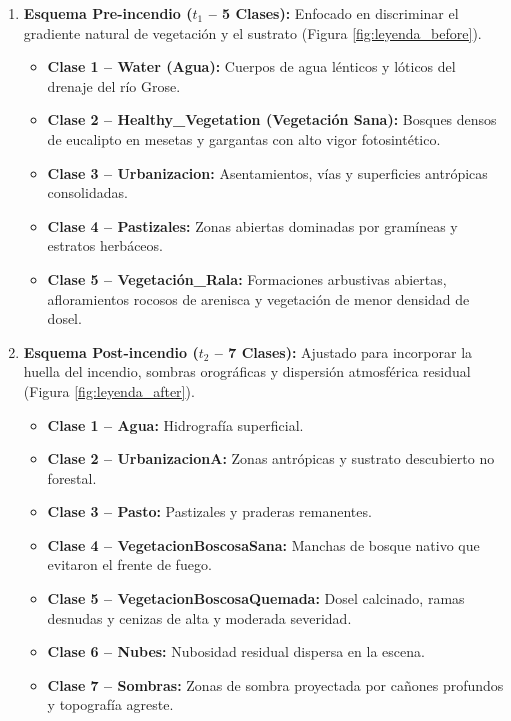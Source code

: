 \documentclass[12pt]{article}
\begin{document}
\begin{enumerate}
    \item \textbf{Esquema Pre-incendio ($t_1$ -- 5 Clases):} Enfocado en discriminar el gradiente natural de vegetación y el sustrato (Figura \ref{fig:leyenda_before}).
    \begin{itemize}
        \item \textbf{Clase 1 -- Water (Agua):} Cuerpos de agua lénticos y lóticos del drenaje del río Grose.
        \item \textbf{Clase 2 -- Healthy\_Vegetation (Vegetación Sana):} Bosques densos de eucalipto en mesetas y gargantas con alto vigor fotosintético.
        \item \textbf{Clase 3 -- Urbanizacion:} Asentamientos, vías y superficies antrópicas consolidadas.
        \item \textbf{Clase 4 -- Pastizales:} Zonas abiertas dominadas por gramíneas y estratos herbáceos.
        \item \textbf{Clase 5 -- Vegetación\_Rala:} Formaciones arbustivas abiertas, afloramientos rocosos de arenisca y vegetación de menor densidad de dosel.
    \end{itemize}

    \item \textbf{Esquema Post-incendio ($t_2$ -- 7 Clases):} Ajustado para incorporar la huella del incendio, sombras orográficas y dispersión atmosférica residual (Figura \ref{fig:leyenda_after}).
    \begin{itemize}
        \item \textbf{Clase 1 -- Agua:} Hidrografía superficial.
        \item \textbf{Clase 2 -- UrbanizacionA:} Zonas antrópicas y sustrato descubierto no forestal.
        \item \textbf{Clase 3 -- Pasto:} Pastizales y praderas remanentes.
        \item \textbf{Clase 4 -- VegetacionBoscosaSana:} Manchas de bosque nativo que evitaron el frente de fuego.
        \item \textbf{Clase 5 -- VegetacionBoscosaQuemada:} Dosel calcinado, ramas desnudas y cenizas de alta y moderada severidad.
        \item \textbf{Clase 6 -- Nubes:} Nubosidad residual dispersa en la escena.
        \item \textbf{Clase 7 -- Sombras:} Zonas de sombra proyectada por cañones profundos y topografía agreste.
    \end{itemize}
\end{enumerate}
\end{document}
